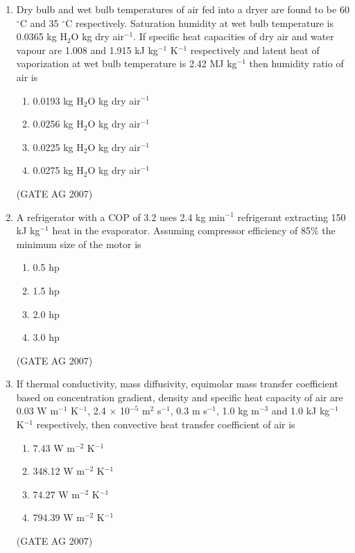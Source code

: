 \documentclass[journal,12pt,onecolumn]{IEEEtran}
\theoremstyle{remark}
\begin{document}
\begin{enumerate}
\item Dry bulb and wet bulb temperatures of air fed into a dryer are found to be 60 $^{\circ}$C and 35 $^{\circ}$C respectively. Saturation humidity at wet bulb temperature is 0.0365 kg H$_2$O kg dry air$^{-1}$. If specific heat capacities of dry air and water vapour are 1.008 and 1.915 kJ kg$^{-1}$ K$^{-1}$ respectively and latent heat of vaporization at wet bulb temperature is 2.42 MJ kg$^{-1}$ then humidity ratio of air is
\begin{multicols}{4}
\begin{enumerate}
    \item  0.0193 kg H$_2$O kg dry air$^{-1}$
   \item 0.0256 kg H$_2$O kg dry air$^{-1}$
    \item 0.0225 kg H$_2$O kg dry air$^{-1}$
    \item 0.0275 kg H$_2$O kg dry air$^{-1}$
\end{enumerate}
\end{multicols}
\hfill(GATE AG 2007)

\item A refrigerator with a COP of 3.2 uses 2.4 kg min$^{-1}$ refrigerant extracting 150 kJ kg$^{-1}$ heat in the evaporator. Assuming compressor efficiency of 85\% the minimum size of the motor is
\begin{multicols}{4}
\begin{enumerate}
    \item 0.5 hp
    \item 1.5 hp
    \item 2.0 hp
    \item 3.0 hp
\end{enumerate}
\end{multicols}
\hfill(GATE AG 2007)

\item If thermal conductivity, mass diffusivity, equimolar mass transfer coefficient based on concentration gradient, density and specific heat capacity of air are 0.03 W m$^{-1}$ K$^{-1}$, 2.4 $\times$ 10$^{-5}$ m$^{2}$ s$^{-1}$, 0.3 m s$^{-1}$, 1.0 kg m$^{-3}$ and 1.0 kJ kg$^{-1}$ K$^{-1}$ respectively, then convective heat transfer coefficient of air is
\begin{multicols}{2}
\begin{enumerate}
    \item 7.43 W m$^{-2}$ K$^{-1}$
    \item 348.12 W m$^{-2}$ K$^{-1}$
    \item 74.27 W m$^{-2}$ K$^{-1}$
    \item 794.39 W m$^{-2}$ K$^{-1}$
\end{enumerate}
\end{multicols}
\hfill(GATE AG 2007)


\end{enumerate}
\end{document}
